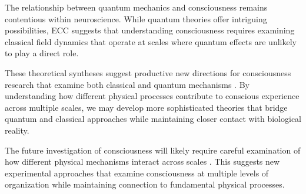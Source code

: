 The relationship between quantum mechanics and consciousness \cite{Stapp2009} remains contentious within neuroscience. While quantum theories offer intriguing possibilities, ECC suggests that understanding consciousness requires examining classical field dynamics that operate at scales where quantum effects are unlikely to play a direct role.

These theoretical syntheses suggest productive new directions for consciousness research that examine both classical and quantum mechanisms \cite{Hagan2002}. By understanding how different physical processes contribute to conscious experience across multiple scales, we may develop more sophisticated theories that bridge quantum and classical approaches while maintaining closer contact with biological reality.

The future investigation of consciousness will likely require careful examination of how different physical mechanisms interact across scales \cite{Beck1992}. This suggests new experimental approaches that examine consciousness at multiple levels of organization while maintaining connection to fundamental physical processes.